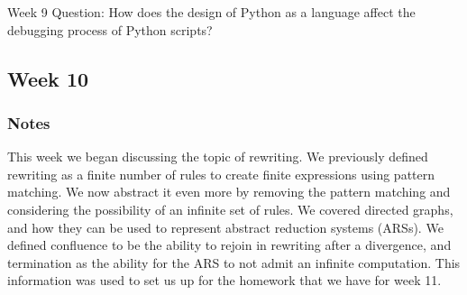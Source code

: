 \documentclass{article}
\theoremstyle{theorem}
\theoremstyle{definition}
\theoremstyle{remark}
\begin{document}
Week 9 Question: How does the design of Python as a language affect the debugging process of Python scripts?

\subsection{Week 10}
\subsubsection*{Notes}
This week we began discussing the topic of rewriting. We previously defined rewriting as a finite number of 
rules to create finite expressions using pattern matching. We now abstract it even more by removing the 
pattern matching and considering the possibility of an infinite set of rules. We covered directed graphs,
and how they can be used to represent abstract reduction systems (ARSs). We defined confluence to be the ability
to rejoin in rewriting after a divergence, and termination as the ability for the ARS to not admit an infinite
computation. This information was used to set us up for the homework that we have for week 11. 
\end{document}
